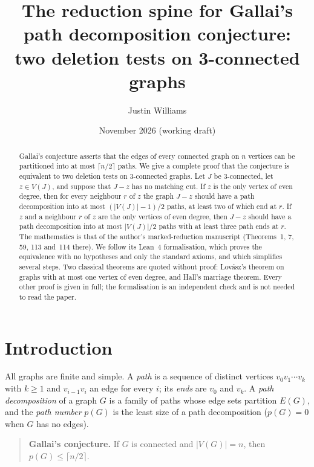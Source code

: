 \documentclass[11pt]{amsart}
\title[The Gallai reduction spine]{The reduction spine for Gallai's path decomposition
conjecture:\\ two deletion tests on 3-connected graphs}
\author{Justin Williams}
\date{November 2026 (working draft)}
\theoremstyle{definition}
\theoremstyle{remark}
\renewcommand{\_}{\oldunderscore\allowbreak}
\begin{document}
\begin{abstract}
Gallai's conjecture asserts that the edges of every connected graph on $n$ vertices can be
partitioned into at most $\lceil n/2\rceil$ paths. We give a complete proof that the
conjecture is equivalent to two deletion tests on $3$-connected graphs. Let $J$ be
$3$-connected, let $z\in V(J)$, and suppose that $J-z$ has no matching cut. If $z$ is the only
vertex of even degree, then for every neighbour $r$ of $z$ the graph $J-z$ should have a path
decomposition into at most $(|V(J)|-1)/2$ paths, at least two of which end at $r$. If $z$ and a
neighbour $r$ of $z$ are the only vertices of even degree, then $J-z$ should have a path
decomposition into at most $|V(J)|/2$ paths with at least three path ends at $r$. The mathematics
is that of the author's marked-reduction manuscript (Theorems~1, 7, 59, 113 and~114 there). We
follow its Lean~4 formalisation, which proves the equivalence with no hypotheses and only the
standard axioms, and which simplifies several steps. Two classical theorems are quoted without
proof: Lov\'asz's theorem on graphs with at most one vertex of even degree, and Hall's marriage
theorem. Every other proof is given in full; the formalisation is an independent check and is not
needed to read the paper.
\end{abstract}

\maketitle

\section{Introduction}\label{sec:intro}

All graphs are finite and simple. A \emph{path} is a sequence of distinct vertices $v_0v_1\cdots
v_k$ with $k\ge1$ and $v_{i-1}v_i$ an edge for every $i$; its \emph{ends} are $v_0$ and $v_k$. A
\emph{path decomposition} of a graph $G$ is a family of paths whose edge sets partition $E(G)$, and
the \emph{path number} $p(G)$ is the least size of a path decomposition ($p(G)=0$ when $G$ has no
edges).

\begin{quote}
\textbf{Gallai's conjecture.} If $G$ is connected and $|V(G)|=n$, then $p(G)\le\lceil n/2\rceil$.
\end{quote}
\end{document}
